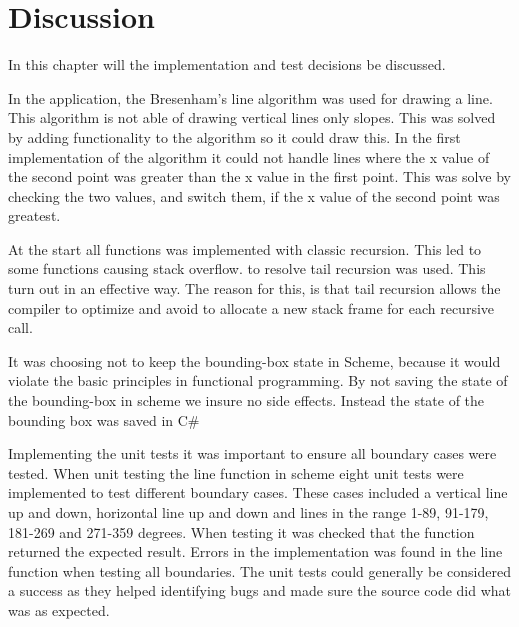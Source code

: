 \chapter{Discussion}
\label{chp:disc}

In this chapter will the implementation and test decisions be discussed. 

In the application, the Bresenham’s line algorithm was used for drawing a line. This algorithm is not able of drawing vertical lines only slopes. This was solved by adding functionality to the algorithm so it could draw this. In the first implementation of the algorithm it could not handle lines where the x value of the second point was greater than the x value in the first point. This was solve by checking the two values, and switch them, if the x value of the second point was greatest.

At the start all functions was implemented with classic recursion. This led to some functions causing stack overflow. to resolve tail recursion was used. This turn out in an effective way. The reason for this, is that tail recursion allows the compiler to optimize and avoid to allocate a new stack frame for each recursive call. 

It was choosing not to keep the bounding-box state in Scheme, because it would violate the basic principles in functional programming. By not saving the state of the bounding-box in scheme we insure no side effects. Instead the state of the bounding box was saved in C\# 

Implementing the unit tests it was important to ensure all boundary cases were tested. When unit testing the line function in scheme eight unit tests were implemented to test different boundary cases. These cases included a vertical line up and down, horizontal line up and down and lines in the range 1-89, 91-179, 181-269 and 271-359 degrees. When testing it was checked that the function returned the expected result. Errors in the implementation was found in the line function when testing all boundaries. The unit tests could generally be considered a success as they helped identifying bugs and made sure the source code did what was as expected.